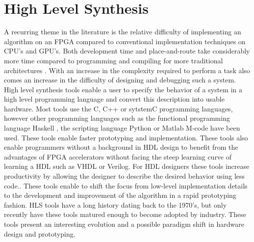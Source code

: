 

\chapter{High Level Synthesis}



A recurring theme in the literature is the relative difficulty of implementing an algorithm on an FPGA compared to conventional implementation techniques on CPU's and GPU's. Both development time and place-and-route take considerably more time compared to programming and compiling for more traditional architectures \cite{inta_chimera:_2012,tsoi_axel:_2010}. With an increase in the complexity required to perform a task also comes an increase in the difficulty of designing and debugging such a system. 
High level synthesis tools enable a user to specify the behavior of a system in a high level programming language and convert this description into usable hardware. Most tools use the C, C++ or sytstemC programming languages, however other programming languages such as the functional programming language Haskell \cite{baaij2010c}, the scripting language Python\cite{decaluwe2004myhdl} or Matlab M-code\cite{hdlcoder} have been used. These tools enable faster prototyping and implementation\cite{che_accelerating_2008}. These tools also enable programmers without a background in HDL design to benefit from the advantages of FPGA accelerators without facing the steep learning curve of learning a HDL such as VHDL or Verilog. For HDL designers these tools increase productivity by allowing the designer to describe the desired behavior using less code.\cite{casseau_c-_2005}. 
These tools enable to shift the focus from low-level implementation details to the development and improvement of the algorithm in a rapid prototyping fashion\cite{wakabayashi_c-based_2004}.
HLS tools have a long history dating back to the 1970's, but only recently have these tools matured enough to become adopted by industry. These tools present an interesting evolution and a possible paradigm shift in hardware design and prototyping\cite{cong_high-level_2011}.



